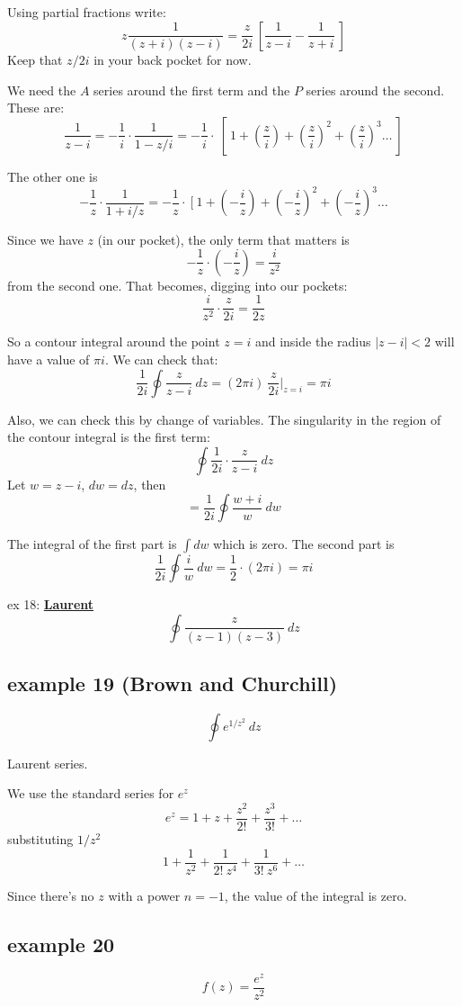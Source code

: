 \documentclass[11pt, oneside]{article}
\begin{document}
Using partial fractions write:
\[ z \frac{1}{(z + i)(z - i)} = \frac{z}{2i} \ [ \frac{1}{z - i} - \frac{1}{z + i}  \  ] \]
Keep that $z/2i$ in your back pocket for now.

We need the $A$ series around the first term and the $P$ series around the second.  These are:
\[ \frac{1}{z - i} = - \frac{1}{i} \cdot \frac{1}{1 - z/i} = - \frac{1}{i} \cdot \ [ \ 1 + (\frac{z}{i}) + (\frac{z}{i})^2 + (\frac{z}{i})^3 \dots \ ] \]

The other one is
\[ - \frac{1}{z} \cdot \frac{1}{1 + i/z} = - \frac{1}{z} \cdot \ [ \ 1 + (-\frac{i}{z}) + (-\frac{i}{z})^2 + (-\frac{i}{z})^3 \dots \]

Since we have $z$ (in our pocket), the only term that matters is
\[ -\frac{1}{z} \cdot (- \frac{i}{z}) = \frac{i}{z^2} \]
from the second one.  That becomes, digging into our pockets:
\[ \frac{i}{z^2} \cdot \frac{z}{2i} = \frac{1}{2z} \]

So a contour integral around the point $z = i$ and inside the radius $|z - i| < 2$ will have a value of $\pi i$.  We can check that:
\[ \frac{1}{2i}  \oint \frac{z}{z - i} \ dz = (2 \pi i) \ \frac{z}{2 i} \bigg |_{z = i} = \pi i \]

Also, we can check this by change of variables.  The singularity in the region of the contour integral is the first term:
\[ \oint \frac{1}{2i} \cdot \frac{z}{z - i} \ dz \]
Let $w = z - i$, $dw = dz$, then
\[ = \frac{1}{2i} \oint \frac{w + i}{w} \ dw \]

The integral of the first part is $\int dw$ which is zero.  The second part is
\[ \frac{1}{2i} \oint \frac{i}{w} \ dw = \frac{1}{2} \cdot (2 \pi i) = \pi i \]

ex 18:  \hyperref[sec:ex18L]{\textbf{Laurent}}
\[ \oint \frac{z}{(z - 1)(z - 3)} \ dz \]

\subsection*{example 19 (Brown and Churchill)}
\[ \oint e^{1/z^2} \ dz \]

Laurent series.

We use the standard series for $e^z$
\[ e^z = 1 + z + \frac{z^2}{2!} + \frac{z^3}{3!} + \dots \]
substituting $1/z^2$
\[ 1 + \frac{1}{z^2} + \frac{1}{2! \ z^4} + \frac{1}{3! \ z^6} + \dots \]

Since there's no $z$ with a power $n=-1$, the value of the integral is zero.

\subsection*{example 20}
\[ f(z) = \frac{e^z}{z^2} \]
\end{document}

